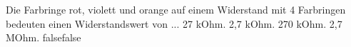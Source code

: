     {Die Farbringe rot, violett und orange auf einem Widerstand mit 4 Farbringen bedeuten einen Widerstandswert von ...}
    {27 kOhm.}
    {2,7 kOhm.}
    {270 kOhm.}
    {2,7 MOhm.}
    {false}{false}